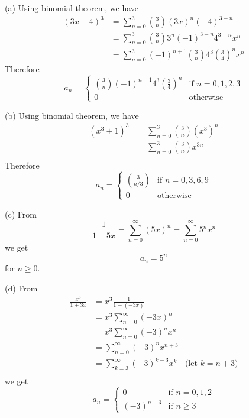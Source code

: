 (a)
Using binomial theorem, we have
\begin{align*}
  (3x - 4)^3 &= \sum_{n=0}^3 \binom{3}{n} (3x)^n(-4)^{3 - n} \\
             &= \sum_{n=0}^3 \binom{3}{n} 3^n(-1)^{3 - n}4^{3 - n}x^n \\
             &= \sum_{n=0}^3 (-1)^{n + 1}\binom{3}{n} 4^3 \left(\frac{3}{4}\right)^n x^n 
\end{align*}
Therefore
\[
a_n =
\begin{cases}
  \binom{3}{n} (-1)^{n - 1}4^3 \left(\frac{3}{4}\right)^n & \text{if $n = 0,1,2,3$}\\
  0 & \text{otherwise}
\end{cases}
\]


(b)
Using binomial theorem, we have
\begin{align*}
(x^3 + 1)^3 &= \sum_{n=0}^3 \binom{3}{n} (x^3)^n \\
            &= \sum_{n=0}^3 \binom{3}{n} x^{3n} \\
\end{align*}
Therefore
\[
a_n =
\begin{cases}
  \binom{3}{n/3} & \text{if $n = 0, 3, 6, 9$}\\ 
  0              & \text{otherwise}
\end{cases}
\]


(c)
From
\[
  \frac{1}{1 - 5x} = \sum_{n=0}^\infty (5x)^n = \sum_{n=0}^\infty 5^n x^n
\]
we get
\[
a_n = 5^n
\]
for $n \geq 0$.


(d)
From
\begin{align*}
  \frac{x^3}{1 + 3x} &= x^3 \frac{1}{1 - (-3x)} \\
                     &= x^3 \sum_{n=0}^\infty (-3x)^n \\
                     &= x^3 \sum_{n=0}^\infty (-3)^n x^n \\
                     &= \sum_{n=0}^\infty (-3)^n x^{n+3} \\
                     &= \sum_{k=3}^\infty (-3)^{k-3} x^{k} & \text{(let $k = n + 3$)}\\
\end{align*}
we get
\[
a_n =
\begin{cases}
  0         & \text{if $n = 0, 1, 2$} \\
  (-3)^{n-3} & \text{if $n \geq 3$}
\end{cases}
\]


